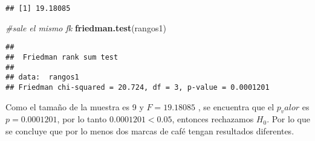 \documentclass[
]{article}
\newenvironment{Shaded}{\begin{snugshade}}{\end{snugshade}}
\newcommand{\CommentTok}[1]{\textcolor[rgb]{0.56,0.35,0.01}{\textit{#1}}}
\newcommand{\FunctionTok}[1]{\textcolor[rgb]{0.13,0.29,0.53}{\textbf{#1}}}
\newcommand{\NormalTok}[1]{#1}
\begin{document}
\begin{verbatim}
## [1] 19.18085
\end{verbatim}

\begin{Shaded}
\begin{Highlighting}[]
\CommentTok{\#sale el mismo fk}
\FunctionTok{friedman.test}\NormalTok{(rangos1)}
\end{Highlighting}
\end{Shaded}

\begin{verbatim}
## 
##  Friedman rank sum test
## 
## data:  rangos1
## Friedman chi-squared = 20.724, df = 3, p-value = 0.0001201
\end{verbatim}

Como el tamaño de la muestra es 9 y \(F = 19.18085\) , se encuentra que
el \(p_valor\) es \(p = 0.0001201\), por lo tanto \(0.0001201 < 0.05\),
entonces rechazamos \(H_0\). Por lo que se concluye que por lo menos dos
marcas de café tengan resultados diferentes.
\end{document}
